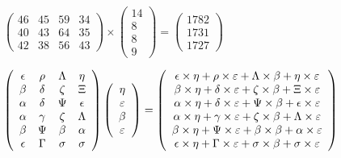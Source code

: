 \documentclass[12pt]{article}
\begin{document}
 
 
\noindent{}
 
 

 
$\left( \begin{array}{ccccccccccccccc}
          46  & 
          45  & 
          59  & 
          34  \\ 
          40  & 
          43  & 
          64  & 
          35  \\ 
          42  & 
          38  & 
          56  & 
          43
\end{array}\right) \times
\left( \begin{array}{c}
          14  \\ 
           8  \\ 
           8  \\ 
           9
\end{array}\right)  =
\left( \begin{array}{c}
        1782  \\ 
        1731  \\ 
        1727
\end{array}\right)  $
 
$  %
 \left( \begin{array}
 {
 c
 c
 c
 c
 }
 \epsilon & 
 \rho & 
 \Lambda & 
 \eta \\ 
 \beta & 
 \delta & 
                    \zeta & 
                    \Xi \\ 
 \alpha & 
 \delta & 
 \Psi & 
 \epsilon \\ 
 \alpha & 
 \gamma & 
                    \zeta & 
 \Lambda \\ 
 \beta & 
 \Psi & 
 \beta & 
 \alpha \\ 
 \epsilon & 
 \Gamma & 
 \sigma & 
 \sigma
 \end{array} \right)
 \left( \begin{array}
 {
 c
 }
 \eta \\ 
 \varepsilon \\ 
 \beta \\ 
 \varepsilon
 \end{array} \right)
=
 \left( \begin{array}
 {
 c
 }
  \epsilon \times  \eta +  \rho \times  \varepsilon +  \Lambda \times  \beta +  \eta \times  \varepsilon \\ 
  \beta \times  \eta +  \delta \times  \varepsilon +                     \zeta \times  \beta +                     \Xi \times  \varepsilon \\ 
  \alpha \times  \eta +  \delta \times  \varepsilon +  \Psi \times  \beta +  \epsilon \times  \varepsilon \\ 
  \alpha \times  \eta +  \gamma \times  \varepsilon +                     \zeta \times  \beta +  \Lambda \times  \varepsilon \\ 
  \beta \times  \eta +  \Psi \times  \varepsilon +  \beta \times  \beta +  \alpha \times  \varepsilon \\ 
  \epsilon \times  \eta +  \Gamma \times  \varepsilon +  \sigma \times  \beta +  \sigma \times  \varepsilon
 \end{array} \right)
$
 
\end{document}
